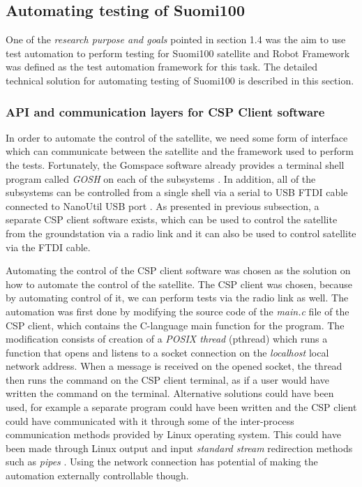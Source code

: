 \documentclass[english,12pt,a4paper,pdftex,elec,utf8]{aaltothesis}
\begin{document}
\subsection{Automating testing of Suomi100}
One of the \textit{research purpose and goals} pointed in section 1.4 was the aim to use test automation to perform testing for Suomi100  satellite and Robot Framework was defined as the test automation framework for this task. The detailed technical solution for automating testing of Suomi100 is described in this section.
\subsubsection{API and communication layers for CSP Client software}
In order to automate the control of the satellite, we need some form of interface which can
communicate between the satellite and the framework used to perform the tests.
Fortunately, the Gomspace software already provides a terminal shell program called \textit{GOSH} on each of the subsystems \cite{nanomindds}. In addition, all of the subsystems can be controlled from a single shell via a serial to USB FTDI cable connected to NanoUtil USB port \cite{avrtoolchain}. As presented in previous subsection,  a separate CSP client
software exists, which can be used to control the satellite from the 
groundstation via a radio link and it can also be used to control satellite via the FTDI cable.\par
Automating the control of the CSP client software was chosen as the solution on how to 
automate the control of the satellite. The CSP client was chosen, because by automating
control of it, we can perform tests via the radio link as well. The automation was first done by
modifying the source code of the \textit{main.c} file of the CSP client, which contains the C-language main function for the program. The modification consists of creation of a \textit{POSIX thread} (pthread) which runs a function that opens and listens to a socket connection on the \textit{localhost} local network address. When a message is received on the opened socket, the thread then runs the command on the CSP client terminal, as if a user would have written the command on the terminal. Alternative solutions could have been used, for example a separate program could have been written and the CSP client could have communicated with it through some of the inter-process communication methods provided by Linux operating system. This could have been made through Linux output and input \textit{standard stream} redirection methods such as \textit{pipes} \cite{linuxproginterface}. Using the network connection has potential of making the automation externally controllable though.\par 
\end{document}
